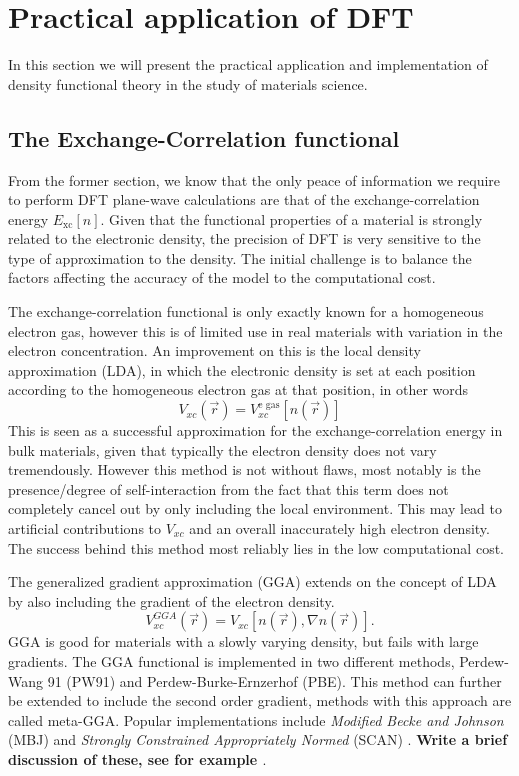 \chapter{Practical application of DFT}
\label{sec:Practical DFT}

In this section we will present the practical application and implementation of density functional theory in the study of materials science.

\section{The Exchange-Correlation functional}

From the former section, we know that the only peace of information we require to perform DFT plane-wave calculations are that of the exchange-correlation energy $E_{\text{xc}}[n]$. Given that the functional properties of a material is strongly related to the electronic density, the precision of DFT is very sensitive to the type of approximation to the density. The initial challenge is to balance the factors affecting the accuracy of the model to the computational cost.

The exchange-correlation functional is only exactly known for a homogeneous electron gas, however this is of limited use in real materials with variation in the electron concentration. An improvement on this is the local density approximation (LDA), in which the electronic density is set at each position according to the homogeneous electron gas at that position, in other words
\begin{equation}
    V_{xc}(\vec{r}) = V_{xc}^{\text{e gas}}[n(\vec{r})]
\end{equation}
This is seen as a successful approximation for the exchange-correlation energy in bulk materials, given that typically the electron density does not vary tremendously. However this method is not without flaws, most notably is the presence/degree of self-interaction from the fact that this term does not completely cancel out by only including the local environment. This may lead to artificial contributions to $V_{xc}$ and an overall inaccurately high electron density. The success behind this method most reliably lies in the low computational cost. 

The generalized gradient approximation (GGA) extends on the concept of LDA by also including the gradient of the electron density. 
\begin{equation}
    V_{xc}^{GGA}(\vec{r}) = V_{xc}[n(\vec{r}), \nabla n(\vec{r})].
\end{equation}
GGA is good for materials with a slowly varying density, but fails with large gradients. The GGA functional is implemented in two different methods, Perdew-Wang 91 (PW91) and Perdew-Burke-Ernzerhof (PBE). This method can further be extended to include the second order gradient, methods with this approach are called meta-GGA. Popular implementations include \textit{Modified Becke and Johnson} (MBJ) \cite{mbj} and \textit{Strongly Constrained Appropriately Normed} (SCAN) \cite{scan}. \textbf{Write a brief discussion of these, see for example \cite{scan2}}.

